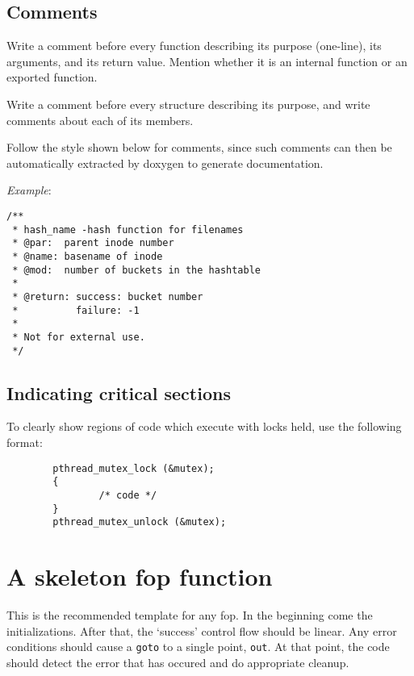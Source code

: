 \documentclass{article}[12pt]
\begin{document}
\subsection*{Comments}
Write a comment before every function describing its purpose (one-line),
its arguments, and its return value. Mention whether it is an internal
function or an exported function.

Write a comment before every structure describing its purpose, and
write comments about each of its members.

Follow the style shown below for comments, since such comments
can then be automatically extracted by doxygen to generate
documentation.

\textsl{Example}:
\begin{verbatim}
/**
 * hash_name -hash function for filenames
 * @par:  parent inode number
 * @name: basename of inode
 * @mod:  number of buckets in the hashtable
 *
 * @return: success: bucket number
 *          failure: -1
 *
 * Not for external use.
 */
\end{verbatim}

\subsection*{Indicating critical sections}
To clearly show regions of code which execute with locks held, use 
the following format:

\begin{verbatim}
        pthread_mutex_lock (&mutex);
        {
                /* code */
        }
        pthread_mutex_unlock (&mutex);
\end{verbatim}

\section*{A skeleton fop function}
This is the recommended template for any fop. In the beginning come
the initializations. After that, the `success' control flow should be
linear.  Any error conditions should cause a \texttt{goto} to a single
point, \texttt{out}.  At that point, the code should detect the error
that has occured and do appropriate cleanup.
\end{document}
